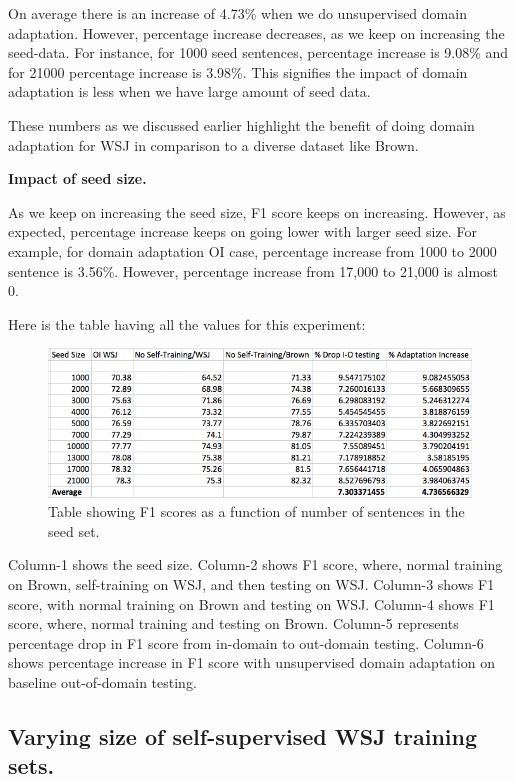 On average there is an increase of 4.73\% when we do unsupervised domain adaptation. However, percentage increase decreases, as we keep on increasing the seed-data. For instance, for 1000 seed sentences, percentage increase is 9.08\% and for 21000 percentage increase is 3.98\%. This signifies the impact of domain adaptation is less when we have large amount of seed data. 

These numbers as we discussed earlier highlight the benefit of doing domain adaptation for WSJ in comparison to a diverse dataset like Brown.

\textbf {Impact of seed size.}

As we keep on increasing the seed size, F1 score keeps on increasing. However, as expected, percentage increase keeps on going lower with larger seed size. For example, for domain adaptation OI case, percentage increase from 1000 to 2000 sentence is 3.56\%. However, percentage increase from 17,000 to 21,000 is almost 0. 

Here is the table having all the values for this experiment:

\begin{figure}[ht!]
\centering
\includegraphics[width=140mm]{exp3-snapshot.png}
\caption{Table showing F1 scores as a function of number of sentences in the seed set. }
\label{accuracy}
\end{figure}

Column-1 shows the seed size. Column-2 shows F1 score, where, normal training on Brown, self-training on WSJ, and then testing on WSJ. Column-3 shows F1 score, with normal training on Brown and testing on WSJ. Column-4 shows F1 score, where, normal training and testing on Brown. Column-5 represents percentage drop in F1 score from in-domain to out-domain testing. Column-6 shows percentage increase in F1 score with unsupervised domain adaptation on baseline out-of-domain testing.

\newpage

\subsection {Varying size of self-supervised WSJ training sets.}

